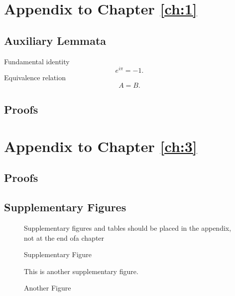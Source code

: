 \begin{appendices}

\chapter{Appendix to Chapter \ref{ch:1}}\label{cha:append-chapt-refch:1}

\section{Auxiliary Lemmata}
Fundamental identity
\begin{equation}
  \label{eq:A}
  e^{i\pi}=-1.
\end{equation}
Equivalence relation
\begin{equation}
  \label{eq:B}
  A=B.
\end{equation}

\section{Proofs}

\chapter{Appendix to Chapter \ref{ch:3}}

\section{Proofs}

\section{Supplementary Figures}

\begin{figure}[ht]
  \centering Supplementary figures and tables should be placed in the appendix,
  not at the end ofa chapter
  \caption{Supplementary Figure}
  \label{fig:figuresup1}
\end{figure}

\begin{figure}[ht]
  \centering
  This is another supplementary figure.
  \caption{Another Figure}
  \label{fig:figuresup3}
\end{figure}


\end{appendices}
